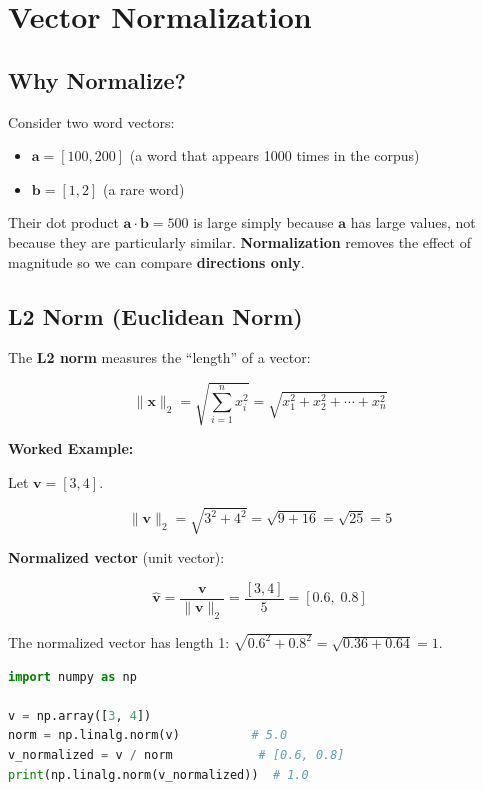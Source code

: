 \documentclass[11pt,a4paper]{article}
\begin{document}
\section{Vector Normalization}

\subsection{Why Normalize?}

Consider two word vectors:
\begin{itemize}[leftmargin=1.5em]
    \item $\mathbf{a} = [100, 200]$ (a word that appears 1000 times in the corpus)
    \item $\mathbf{b} = [1, 2]$ (a rare word)
\end{itemize}

Their dot product $\mathbf{a} \cdot \mathbf{b} = 500$ is large simply because $\mathbf{a}$ has large values, not because they are particularly similar. \textbf{Normalization} removes the effect of magnitude so we can compare \textbf{directions only}.

\subsection{L2 Norm (Euclidean Norm)}

The \textbf{L2 norm} measures the ``length'' of a vector:

\begin{equation}
\boxed{\|\mathbf{x}\|_2 = \sqrt{\sum_{i=1}^{n} x_i^2} = \sqrt{x_1^2 + x_2^2 + \cdots + x_n^2}}
\end{equation}

\medskip\noindent\textbf{Worked Example:}

Let $\mathbf{v} = [3, 4]$.

\[
\|\mathbf{v}\|_2 = \sqrt{3^2 + 4^2} = \sqrt{9 + 16} = \sqrt{25} = 5
\]

\textbf{Normalized vector} (unit vector):

\[
\hat{\mathbf{v}} = \frac{\mathbf{v}}{\|\mathbf{v}\|_2} = \frac{[3, 4]}{5} = [0.6,\; 0.8]
\]

The normalized vector has length 1: $\sqrt{0.6^2 + 0.8^2} = \sqrt{0.36 + 0.64} = 1$.

\begin{lstlisting}[language=Python]
import numpy as np

v = np.array([3, 4])
norm = np.linalg.norm(v)          # 5.0
v_normalized = v / norm            # [0.6, 0.8]
print(np.linalg.norm(v_normalized))  # 1.0
\end{lstlisting}
\end{document}
